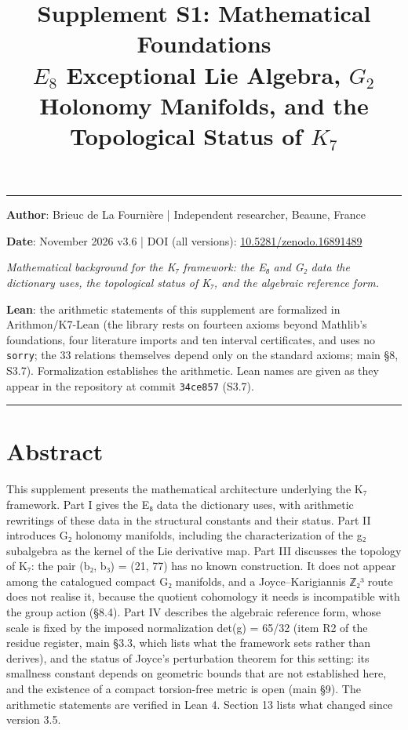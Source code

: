 \documentclass[11pt,a4paper]{article}
\title{%
\LARGE\textbf{Supplement S1: Mathematical Foundations}\\[0.3em]
\large $E_8$ Exceptional Lie Algebra, $G_2$ Holonomy Manifolds, and the Topological Status of $K_7$%
}
\author{}
\date{}
\begin{document}
\maketitle
\noindent\rule{\textwidth}{0.2pt}

\noindent\textbf{Author}: Brieuc de La Fourni\`ere \quad | \quad Independent researcher, Beaune, France

\noindent\textbf{Date}: November 2026 \quad v3.6 \quad | \quad DOI (all versions): \href{https://doi.org/10.5281/zenodo.16891489}{10.5281/zenodo.16891489}

\thispagestyle{fancy}

\emph{Mathematical background for the K₇ framework: the E₈ and G₂ data the dictionary uses, the topological status of K₇, and the algebraic reference form.}

\textbf{Lean}: the arithmetic statements of this supplement are formalized in Arithmon/K7-Lean (the library rests on fourteen axioms beyond Mathlib's foundations, four literature imports and ten interval certificates, and uses no \texttt{sorry}; the 33 relations themselves depend only on the standard axioms; main §8, S3.7). Formalization establishes the arithmetic. Lean names are given as they appear in the repository at commit \texttt{34ce857} (S3.7).

\begin{center}\rule{\linewidth}{0.5pt}\end{center}

\section{Abstract}\label{abstract}

This supplement presents the mathematical architecture underlying the K₇ framework. Part I gives the E₈ data the dictionary uses, with arithmetic rewritings of these data in the structural constants and their status. Part II introduces G₂ holonomy manifolds, including the characterization of the g₂ subalgebra as the kernel of the Lie derivative map. Part III discusses the topology of K₇: the pair (b₂, b₃) = (21, 77) has no known construction. It does not appear among the catalogued compact G₂ manifolds, and a Joyce--Karigiannis ℤ₂³ route does not realise it, because the quotient cohomology it needs is incompatible with the group action (§8.4). Part IV describes the algebraic reference form, whose scale is fixed by the imposed normalization det(g) = 65/32 (item R2 of the residue register, main §3.3, which lists what the framework sets rather than derives), and the status of Joyce's perturbation theorem for this setting: its smallness constant depends on geometric bounds that are not established here, and the existence of a compact torsion-free metric is open (main §9). The arithmetic statements are verified in Lean 4. Section 13 lists what changed since version 3.5.
\end{document}
